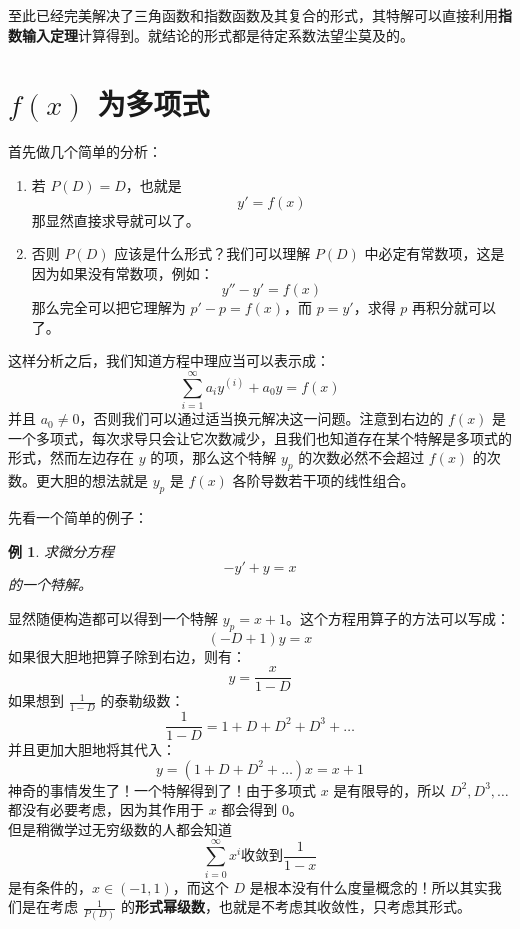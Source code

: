 \documentclass{article}
\newtheorem{exm}{例}[section]
\begin{document}
\noindent 至此已经完美解决了三角函数和指数函数及其复合的形式，其特解可以直接利用\textbf{\Large {指数输入定理}}计算得到。就结论的形式都是待定系数法望尘莫及的。

\section{$f(x)$ 为多项式}

\noindent 首先做几个简单的分析：
\begin{enumerate}[(1)]
    \item 若 $P(D) = D$，也就是
    $$
    y' = f(x)
    $$
    那显然直接求导就可以了。
    \item 否则 $P(D)$ 应该是什么形式？我们可以理解 $P(D)$ 中必定有常数项，这是因为如果没有常数项，例如：
    $$
    y'' - y' = f(x)
    $$
    那么完全可以把它理解为 $p' - p = f(x)$，而 $p = y'$，求得 $p$ 再积分就可以了。
\end{enumerate}

\noindent 这样分析之后，我们知道方程中理应当可以表示成：
$$
\sum_{i = 1}^{\infty} a_iy^{(i)} + a_0y = f(x)
$$
并且 $a_0 \neq 0$，否则我们可以通过适当换元解决这一问题。注意到右边的 $f(x)$ 是一个多项式，每次求导只会让它次数减少，且我们也知道存在某个特解是多项式的形式，然而左边存在 $y$ 的项，那么这个特解 $y_p$ 的次数必然不会超过 $f(x)$ 的次数。更大胆的想法就是 $y_p$ 是 $f(x)$ 各阶导数若干项的线性组合。

\noindent 先看一个简单的例子：
\begin{exm}
求微分方程
$$
-y' + y = x
$$
的一个特解。
\end{exm}
\noindent 显然随便构造都可以得到一个特解 $y_p = x + 1$。这个方程用算子的方法可以写成：
$$
(-D + 1)y = x
$$
如果很大胆地把算子除到右边，则有：
$$
y = \frac{x}{1-D}
$$
如果想到 $\frac{1}{1-D}$ 的泰勒级数：
$$
\frac{1}{1-D} = 1+D+D^2+D^3+\ldots
$$
并且更加大胆地将其代入：
$$
y = (1+D+D^2+\ldots)x = x + 1
$$
神奇的事情发生了！一个特解得到了！由于多项式 $x$ 是有限导的，所以 $D^2,D^3,\ldots$ 都没有必要考虑，因为其作用于 $x$ 都会得到 $0$。\\
\noindent 但是稍微学过无穷级数的人都会知道
$$
\sum_{i = 0}^{\infty}x^i \text{收敛到} \frac{1}{1-x}
$$
是有条件的，$x\in(-1,1)$，而这个 $D$ 是根本没有什么度量概念的！所以其实我们是在考虑 $\frac{1}{P(D)}$ 的\textbf{形式幂级数}，也就是不考虑其收敛性，只考虑其形式。
\end{document}
